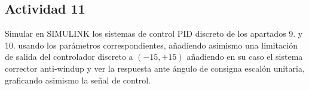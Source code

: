 \subsection{Actividad 11}
Simular en \textsc{SIMULINK} los sistemas de control PID
discreto de los apartados 9. y 10. usando los parámetros
correspondientes, añadiendo asimismo una limitación de salida del
controlador discreto a $(-15,+15)$ añadiendo en su caso el sistema
corrector anti-windup y ver la respuesta ante ángulo de consigna
escalón unitaria, graficando asimismo la señal de control.

\begin{tcolorbox}[sharp corners, colframe=bluebox, title= Simulink PD]


\end{tcolorbox}
